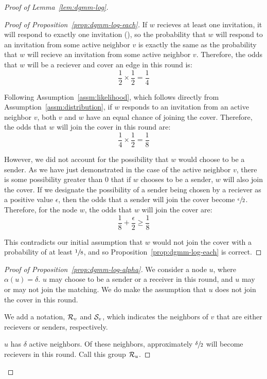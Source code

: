 \begin{proof}[Proof of Lemma~\ref{lem:dgmm-log}]
\begin{proof}[Proof of Proposition~\ref{prop:dgmm-log-each}]
If $w$ recieves at least one invitation, it will respond to exactly one invitation (), so the probability that $w$ will respond to an invitation from some active neighbor $v$ is exactly the same as the probability that $w$ will recieve an invitation from some active neighbor $v$. Therefore, the odds that $w$ will be a reciever and cover an edge in this round is: \begin{equation*}\frac{1}{2} \times \frac{1}{2} = \frac{1}{4}\end{equation*}

Following Assumption~\ref{assm:likelihood}, which follows directly from Assumption~\ref{assm:distribution}, if $w$ responds to an invitation from an active neighbor $v$, both $v$ and $w$ have an equal chance of joining the cover. Therefore, the odds that $w$ will join the cover in this round are:\begin{equation*}\frac{1}{4} \times \frac{1}{2} = \frac{1}{8}\end{equation*}

However, we did not account for the possibility that $w$ would choose to be a sender. As we have just demonstrated in the case of the active neighbor $v$, there is some possibility greater than 0 that if $w$ chooses to be a sender, $w$ will also join the cover. If we designate the possibility of a sender being chosen by a reciever as a positive value $\epsilon$, then the odds that a sender will join the cover become $\sfrac{\epsilon}{2}$. Therefore, for the node $w$, the odds that $w$ will join the cover are:\begin{equation*}\frac{1}{8} + \frac{\epsilon}{2} \ge \frac{1}{8}\end{equation*}

This contradicts our initial assumption that $w$ would not join the cover with a probability of at least $\sfrac{1}{8}$, and so Proposition~\ref{prop:dgmm-log-each} is correct.
\end{proof}
\begin{proof}[Proof of Proposition~\ref{prop:dgmm-log-alpha}]
We consider a node $u$, where $\alpha(u) = \delta$. $u$ may choose to be a sender or a receiver in this round, and $u$ may or may not join the matching. We do make the assumption that $u$ does not join the cover in this round.

We add a notation, ${\mathcal R}_v$ and ${\mathcal S}_v$, which indicates the neighbors of $v$ that are either recievers or senders, respectively.

$u$ has $\delta$ active neighbors. Of these neighbors, approximately $\sfrac{\delta}{2}$ will become recievers in this round. Call this group ${\mathcal R}_u$. 


\end{proof}
\end{proof}
